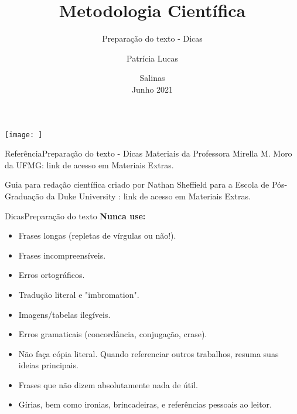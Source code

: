 \documentclass[t]{beamer}
\title[]{Metodologia Científica}
\subtitle[]{Preparação do texto - Dicas}
\author[]{Patrícia Lucas\\{\footnotesize }}
\institute{Bacharelado em Sistemas de Informação \\ IFNMG  - Campus Salinas}
\date{\scriptsize Salinas\\Junho 2021}
\begin{document}
\begin{frame}

\begin{center}
\texttt{[image: ]}
\end{center}
  \titlepage
\end{frame}


\begin{ftst}{Referência}{Preparação do texto - Dicas}
\vone
Materiais da Professora Mirella M. Moro da UFMG: link de acesso em Materiais Extras.

\vone
Guia para redação científica criado por Nathan Sheffield para a Escola de Pós-Graduação da Duke University : link de acesso em Materiais Extras.

\end{ftst}


\begin{ftst}{Dicas}{Preparação do texto}
\justifying
\textbf{Nunca use:}
\vone

\begin{itemize}
    \item Frases longas (repletas de vírgulas ou não!).
    \item Frases incompreensíveis.
    \item Erros ortográficos.
    \item Tradução literal e "imbromation".
    \item Imagens/tabelas ilegíveis.
    \item Erros gramaticais (concordância, conjugação, crase).
    \item Não faça cópia literal. Quando referenciar outros trabalhos, resuma suas ideias principais.
    \item Frases que não dizem absolutamente nada de útil.
    \item Gírias, bem como ironias, brincadeiras, e referências pessoais ao leitor.
\end{itemize}

\end{ftst}
\end{document}
